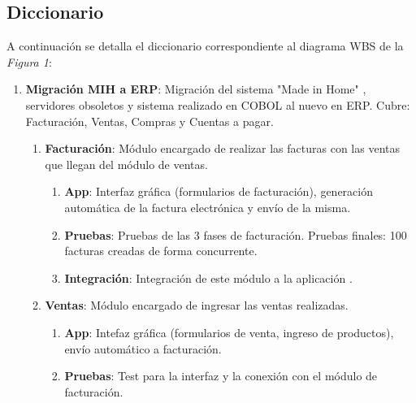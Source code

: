 \documentclass{article}
\begin{document}
\subsection{Diccionario}

	A continuación se detalla el diccionario correspondiente al diagrama WBS de la \textit{Figura 1}:
	\bigskip

	\begin{enumerate}
		\itemsep=3pt \topsep=0pt \partopsep=0pt \parskip=0pt \parsep=0pt
		
		\item \textbf{Migración MIH a ERP}: Migración del sistema "Made in Home" , servidores obsoletos y sistema realizado en COBOL al nuevo en ERP. Cubre: Facturación, Ventas, Compras y Cuentas a pagar.

			\begin{enumerate}[label*=\arabic*.]

				\item \textbf{Facturación}: Módulo encargado de realizar las facturas con las ventas que llegan del módulo de ventas.

					\begin{enumerate}[label*=\arabic*.]
						\itemsep=3pt \topsep=0pt \partopsep=0pt \parskip=0pt \parsep=0pt

						\item \textbf{App}: Interfaz gráfica (formularios de facturación), generación automática de la factura electrónica y envío de la misma. 

						\item \textbf{Pruebas}: Pruebas de las 3 fases de facturación. Pruebas finales: 100 facturas creadas de forma concurrente.

						\item \textbf{Integración}: Integración de este módulo a la aplicación .

					\end{enumerate}
			
				\item \textbf{Ventas}: Módulo encargado de ingresar las ventas realizadas.

					\begin{enumerate}[label*=\arabic*.]
						\itemsep=3pt \topsep=0pt \partopsep=0pt \parskip=0pt \parsep=0pt

						\item \textbf{App}: Intefaz gráfica (formularios de venta, ingreso de productos), envío automático a facturación. 

						\item \textbf{Pruebas}: Test para la interfaz y la conexión con el módulo de facturación.


\end{enumerate}
\end{enumerate}
\end{enumerate}
\end{document}
